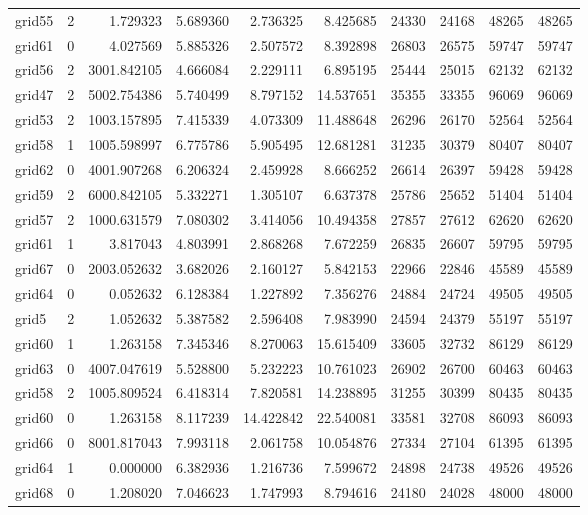 \begin{longtable}{|l|r|r|r|r|r|r|r|r|r|}
grid55 & 2 & 1.729323 & 5.689360 & 2.736325 & 8.425685 & 24330 & 24168 & 48265 & 48265 \\
grid61 & 0 & 4.027569 & 5.885326 & 2.507572 & 8.392898 & 26803 & 26575 & 59747 & 59747 \\
grid56 & 2 & 3001.842105 & 4.666084 & 2.229111 & 6.895195 & 25444 & 25015 & 62132 & 62132 \\
grid47 & 2 & 5002.754386 & 5.740499 & 8.797152 & 14.537651 & 35355 & 33355 & 96069 & 96069 \\
grid53 & 2 & 1003.157895 & 7.415339 & 4.073309 & 11.488648 & 26296 & 26170 & 52564 & 52564 \\
grid58 & 1 & 1005.598997 & 6.775786 & 5.905495 & 12.681281 & 31235 & 30379 & 80407 & 80407 \\
grid62 & 0 & 4001.907268 & 6.206324 & 2.459928 & 8.666252 & 26614 & 26397 & 59428 & 59428 \\
grid59 & 2 & 6000.842105 & 5.332271 & 1.305107 & 6.637378 & 25786 & 25652 & 51404 & 51404 \\
grid57 & 2 & 1000.631579 & 7.080302 & 3.414056 & 10.494358 & 27857 & 27612 & 62620 & 62620 \\
grid61 & 1 & 3.817043 & 4.803991 & 2.868268 & 7.672259 & 26835 & 26607 & 59795 & 59795 \\
grid67 & 0 & 2003.052632 & 3.682026 & 2.160127 & 5.842153 & 22966 & 22846 & 45589 & 45589 \\
grid64 & 0 & 0.052632 & 6.128384 & 1.227892 & 7.356276 & 24884 & 24724 & 49505 & 49505 \\
grid5 & 2 & 1.052632 & 5.387582 & 2.596408 & 7.983990 & 24594 & 24379 & 55197 & 55197 \\
grid60 & 1 & 1.263158 & 7.345346 & 8.270063 & 15.615409 & 33605 & 32732 & 86129 & 86129 \\
grid63 & 0 & 4007.047619 & 5.528800 & 5.232223 & 10.761023 & 26902 & 26700 & 60463 & 60463 \\
grid58 & 2 & 1005.809524 & 6.418314 & 7.820581 & 14.238895 & 31255 & 30399 & 80435 & 80435 \\
grid60 & 0 & 1.263158 & 8.117239 & 14.422842 & 22.540081 & 33581 & 32708 & 86093 & 86093 \\
grid66 & 0 & 8001.817043 & 7.993118 & 2.061758 & 10.054876 & 27334 & 27104 & 61395 & 61395 \\
grid64 & 1 & 0.000000 & 6.382936 & 1.216736 & 7.599672 & 24898 & 24738 & 49526 & 49526 \\
grid68 & 0 & 1.208020 & 7.046623 & 1.747993 & 8.794616 & 24180 & 24028 & 48000 & 48000 \\

\end{longtable}
